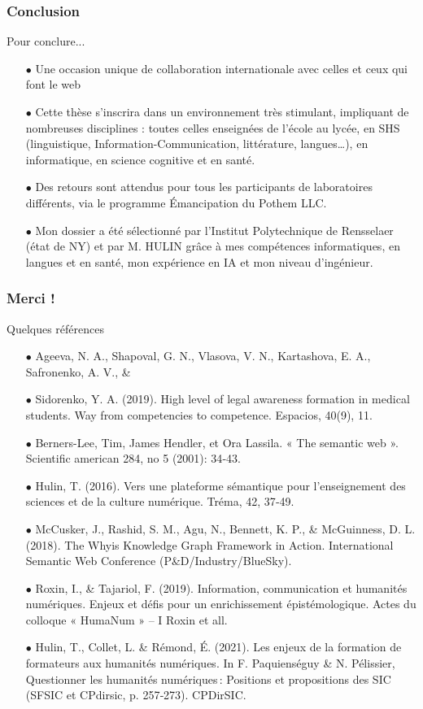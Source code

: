 \documentclass[xcolor=dvipsnames]{beamer}
\begin{document}
\begin{frame}[fragile]
	\frametitle{Conclusion}
	\begin{block}{Pour conclure...}
		\small{
	\begin{itemize}
		\item[$\bullet$]Une occasion unique de collaboration internationale avec celles et ceux qui font le web
		\item[$\bullet$]Cette thèse s'inscrira dans un environnement très stimulant, impliquant de nombreuses disciplines : toutes celles enseignées de l'école au lycée, en SHS (linguistique, Information-Communication, littérature, langues…), en informatique, en science cognitive et en santé.
		\item[$\bullet$]Des retours sont attendus pour tous les participants de laboratoires différents, via le programme Émancipation du Pothem LLC.
		\item[$\bullet$]Mon dossier a été sélectionné par l'Institut Polytechnique de Rensselaer (état de NY) et par M. HULIN grâce à mes compétences informatiques, en langues et en santé, mon expérience en IA et mon niveau d'ingénieur.
	\end{itemize}}
\end{block}
\end{frame}

\begin{frame}[fragile]
\frametitle{Merci !}
\begin{block}{Quelques références}
	\tiny{
		\begin{itemize}
\item[$\bullet$]Ageeva, N. A., Shapoval, G. N., Vlasova, V. N., Kartashova, E. A., Safronenko, A. V., \& \item[$\bullet$]Sidorenko, Y. A. (2019). High level of legal awareness formation in medical students. Way from competencies to competence. Espacios, 40(9), 11.
\item[$\bullet$]Berners-Lee, Tim, James Hendler, et Ora Lassila. « The semantic web ». Scientific american 284, no 5 (2001): 34‑43.
\item[$\bullet$]Hulin, T. (2016). Vers une plateforme sémantique pour l’enseignement des sciences et de la culture numérique. Tréma, 42, 37‑49.
\item[$\bullet$]McCusker, J., Rashid, S. M., Agu, N., Bennett, K. P., \& McGuinness, D. L. (2018). The Whyis Knowledge Graph Framework in Action. International Semantic Web Conference (P\&D/Industry/BlueSky).
\item[$\bullet$]Roxin, I., \& Tajariol, F. (2019). Information, communication et humanités numériques. Enjeux et défis pour un enrichissement épistémologique. Actes du colloque « HumaNum » – I Roxin et all.
\item[$\bullet$]Hulin, T., Collet, L. \& Rémond, É. (2021). Les enjeux de la formation de formateurs aux humanités numériques. In F. Paquienséguy \& N. Pélissier, Questionner les humanités numériques : Positions et propositions des SIC (SFSIC et CPdirsic, p. 257‑273). CPDirSIC.
	\end{itemize}}
\end{block}
\end{frame}
\end{document}
